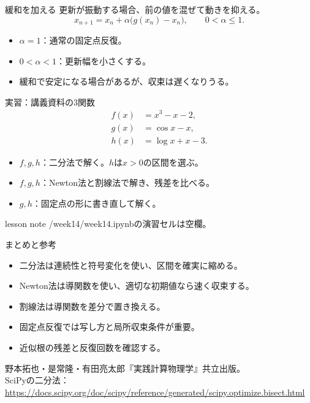 \documentclass[12pt,aspectratio=43]{beamer}
\newcommand{\code}[1]{{\codefont #1}}
\newenvironment{lessonbox}
  {\begin{beamercolorbox}[wd=\linewidth,sep=1.5mm]{lesson note}}
  {\end{beamercolorbox}\par}
\begin{document}
\begin{frame}[t]{緩和を加える}
  更新が振動する場合、前の値を混ぜて動きを抑える。
  \[
    x_{n+1}=x_n+\alpha\bigl(g(x_n)-x_n\bigr),\qquad 0<\alpha\leq1.
  \]
  \begin{itemize}
    \item \(\alpha=1\)：通常の固定点反復。
    \item \(0<\alpha<1\)：更新幅を小さくする。
    \item 緩和で安定になる場合があるが、収束は遅くなりうる。
  \end{itemize}
\end{frame}

\begin{frame}[t]{実習：講義資料の3関数}
  \[
    \begin{aligned}
      f(x)&=x^3-x-2,\\
      g(x)&=\cos x-x,\\
      h(x)&=\log x+x-3.
    \end{aligned}
  \]
  \begin{itemize}
    \item \(f,g,h\)：二分法で解く。\(h\)は\(x>0\)の区間を選ぶ。
    \item \(f,g,h\)：Newton法と割線法で解き、残差を比べる。
    \item \(g,h\)：固定点の形に書き直して解く。
  \end{itemize}
  \vfill
  \begin{lessonbox}
    \code{2026/week14/week14.ipynb}の演習セルは空欄。
  \end{lessonbox}
\end{frame}

\begin{frame}[t]{まとめと参考}
  \begin{itemize}
    \item 二分法は連続性と符号変化を使い、区間を確実に縮める。
    \item Newton法は導関数を使い、適切な初期値なら速く収束する。
    \item 割線法は導関数を差分で置き換える。
    \item 固定点反復では写し方と局所収束条件が重要。
    \item 近似根の残差と反復回数を確認する。
  \end{itemize}
  \vfill
  {\footnotesize
    野本拓也・是常隆・有田亮太郎『実践計算物理学』共立出版。\\
    SciPyの二分法：\url{https://docs.scipy.org/doc/scipy/reference/generated/scipy.optimize.bisect.html}}
\end{frame}
\end{document}

